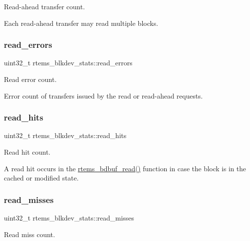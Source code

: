Read-\/ahead transfer count. 

Each read-\/ahead transfer may read multiple blocks. \mbox{\label{structrtems__blkdev__stats_a309a8576315f9ee5785d1b3a5c29c123}} 
\subsubsection{\texorpdfstring{read\_errors}{read\_errors}}
{\footnotesize\ttfamily uint32\+\_\+t rtems\+\_\+blkdev\+\_\+stats\+::read\+\_\+errors}



Read error count. 

Error count of transfers issued by the read or read-\/ahead requests. \mbox{\label{structrtems__blkdev__stats_af736623d6402bae1d180e1f896aed6be}} 
\subsubsection{\texorpdfstring{read\_hits}{read\_hits}}
{\footnotesize\ttfamily uint32\+\_\+t rtems\+\_\+blkdev\+\_\+stats\+::read\+\_\+hits}



Read hit count. 

A read hit occurs in the \mbox{\hyperlink{group__rtems__bdbuf_ga8546cefc842eef10cdb5b38a6cead9f7}{rtems\+\_\+bdbuf\+\_\+read()}} function in case the block is in the cached or modified state. \mbox{\label{structrtems__blkdev__stats_ad68da4f36c9175bba1d07183d83babc3}} 
\subsubsection{\texorpdfstring{read\_misses}{read\_misses}}
{\footnotesize\ttfamily uint32\+\_\+t rtems\+\_\+blkdev\+\_\+stats\+::read\+\_\+misses}



Read miss count. 

